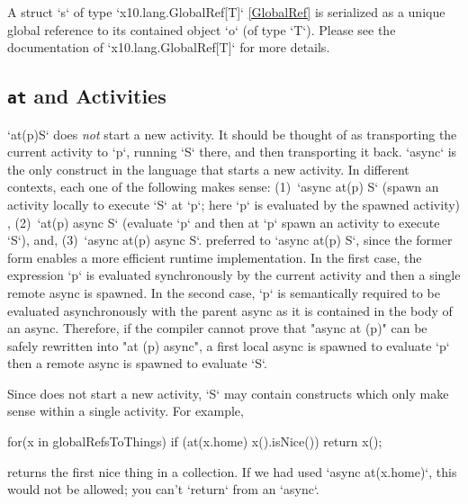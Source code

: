 A struct \xcd`s` of type \xcd`x10.lang.GlobalRef[T]` \ref{GlobalRef}
is serialized as a unique global reference to its contained object
\xcd`o` (of type \xcd`T`).  Please see the documentation
of \xcd`x10.lang.GlobalRef[T]` for more details.



\subsection{{\tt at} and Activities}
\xcd`at(p)S` 
does {\em not} start a new activity.  It should be thought of as
transporting the current activity to \xcd`p`, running \xcd`S` there, and then
transporting it back.  \xcd`async` is the only construct in the
language that starts a new activity. In different contexts, each one
of the following makes sense:
(1)~\xcd`async at(p) S` 
(spawn an activity locally to execute \xcd`S` at
\xcd`p`; here \xcd`p` is evaluated by the spawned activity) , 
(2)~\xcd`at(p) async S` 
(evaluate \xcd`p` and then at \xcd`p` spawn an
activity to execute \xcd`S`), and,
(3)~\xcd`async at(p) async S`. 
preferred to \xcd`async at(p) S`, since the former form enables a more
efficient runtime implementation.  In the first case, the expression
\xcd`p` is evaluated synchronously by the current activity and then a
single remote async is spawned.  In the second case, \xcd`p` is
semantically required to be evaluated asynchronously with the parent
async as it is contained in the body of an async.  Therefore, if the
compiler cannot prove that "async at (p)" can be safely rewritten into
"at (p) async", a first local async is spawned to evaluate \xcd`p`
then a remote async is spawned to evaluate \xcd`S`.

Since 
does not start a new activity, 
\xcd`S` may contain constructs which only make sense
within a single activity.  
For example, 
\begin{xten}
    for(x in globalRefsToThings) 
      if (at(x.home) x().isNice()) 
        return x();
\end{xten}
returns the first nice thing in a collection.   If we had used 
\xcd`async at(x.home)`, this would not be allowed; 
you can't \xcd`return` from an
\xcd`async`. 

